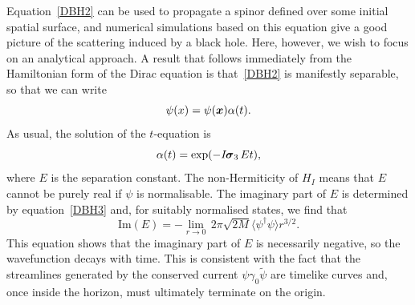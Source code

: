 \documentclass[a4paper]{article}
\numberwithin{equation}{section}
\newcommand{\la}{\langle}
\newcommand{\ra}{\rangle}
\newcommand{\alp}{\alpha}
\newcommand{\sig}{\mbox{\boldmath $\sigma$}}
\newcommand{\bx}{\mbox{\boldmath $x$}}
\newcommand{\bsig}{\mbox{\boldmath $\sig$}}
\newcommand{\isk}{I \hspace{-1pt} \bsig_3}
\newcommand{\go}{\gamma_{0}}
\newcommand{\psirev}{\tilde{\psi}}
\newcommand{\psidag}{\psi^{\dagger}}
\begin{document}
Equation~\eqref{DBH2} can be used to propagate a spinor defined over some
initial spatial surface, and numerical simulations based on this
equation give a good picture of the scattering induced by a black
hole.  Here, however, we wish to focus on an analytical approach.  A
result that follows immediately from the Hamiltonian form of the Dirac
equation is that~\eqref{DBH2} is manifestly separable, so that we can
write
%
\begin{equation}
\psi(x) =  \psi(\bx) \alp(t).
\end{equation}
%
As usual, the solution of the $t$-equation is
%
\begin{equation}
\alp(t) = \exp(-\isk \, Et),
\end{equation}
%
where $E$ is the separation constant.  The non-Hermiticity of $H_I$
means that $E$ cannot be purely real if $\psi$ is normalisable.  The
imaginary part of $E$ is determined by equation~\eqref{DBH3} and, for
suitably normalised states, we find that
%
\begin{equation}
\mbox{Im}(E) = - \lim_{r\rightarrow 0} \, 2 \pi \sqrt{2M} \la \psidag \psi
\ra r^{3/2}.
\end{equation}
%
This equation shows that the imaginary part of $E$ is necessarily
negative, so the wavefunction decays with time.  This is consistent
with the fact that the streamlines generated by the conserved current
$\psi\go\psirev$ are timelike curves and, once inside the horizon,
must ultimately terminate on the origin.
\end{document}
